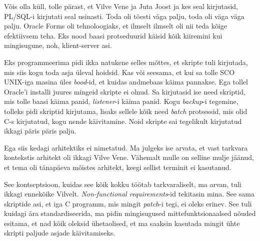 
Võis olla küll, tolle pärast, et Vilve Vene ja Juta Joost ja kes seal kirjutasid, PL/SQL-i kirjutati seal usinasti. Toda oli tõesti väga palju, toda oli väga väga palju. Oracle Forms oli tehnoloogiaks, et ilmselt ilmselt oli nii teda kõige efektiivsem teha. Eks nood baasi protseduurid käisid kõik kiiremini kui mingisugune, noh, klient-server asi.


Eks programmeerima pidi ikka natukene selles mõttes, et skripte tuli kirjutada, mis  siis kogu toda asja üleval hoidsid. Kas või seesama, et kui sa tolle SCO UNIX-iga masina üles \emph{bood}-id, et kuidas andmebaas käima pannakse. Ega tollel Oracle'i installi juures mingeid skripte ei olnud. Sa kirjutasid ise need skriptid, mis tolle baasi käima panid, \emph{listener}-i käima panid. Kogu \emph{backup}-i tegemine, tolleks pidi skriptid kirjutama, lisaks sellele kõik need \emph{batch} protsessid, mis olid C-s kirjutatud, kogu nende käivitamine. Noid skripte  sai tegelikult kirjutatud ikkagi päris päris palju.


Ega siis kedagi arhitektiks ei nimetatud. Ma julgeks ise arvata, et vast tarkvara kontekstis arhitekt oli ikkagi Vilve Vene. Vähemalt  mulle on selline mulje jäänud, et tema oli tänapäeva mõistes arhitekt, keegi sellist terminit ei kasutanud. 

See kontseptsioon, kuidas see kõik kokku töötab tarkvaraliselt, ma arvan, tuli ikkagi ennekõike Vilvelt. \emph{Non-functional requirements}-id tekitasin mina. See sama skriptide asi, et iga  C programm, mis mingit \emph{patch}-i tegi, ei oleks erinev. See tuli kuidagi ära standardiseerida,  ma pidin mingisugused  mittefunktsionaalsed nõuded esitama, et nad kõik oleksid ühetaolised, et ma saaksin kasutada mingit ühte skripti paljude asjade käivitamiseks.


